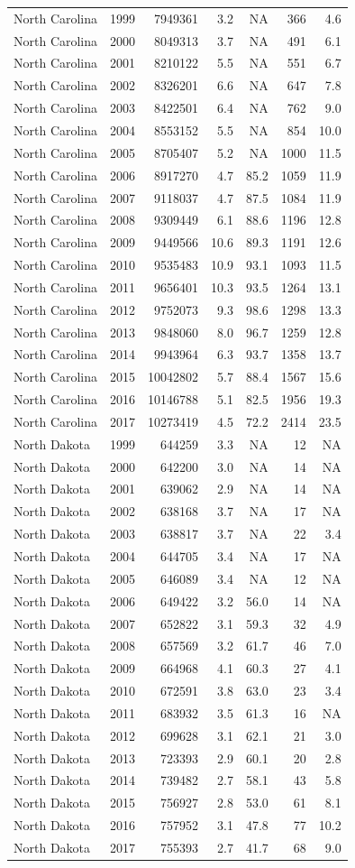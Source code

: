 \documentclass[
]{article}
\begin{document}
\begin{longtable}[]{@{}lrrrrrr@{}}
North Carolina & 1999 & 7949361 & 3.2 & NA & 366 & 4.6\tabularnewline
North Carolina & 2000 & 8049313 & 3.7 & NA & 491 & 6.1\tabularnewline
North Carolina & 2001 & 8210122 & 5.5 & NA & 551 & 6.7\tabularnewline
North Carolina & 2002 & 8326201 & 6.6 & NA & 647 & 7.8\tabularnewline
North Carolina & 2003 & 8422501 & 6.4 & NA & 762 & 9.0\tabularnewline
North Carolina & 2004 & 8553152 & 5.5 & NA & 854 & 10.0\tabularnewline
North Carolina & 2005 & 8705407 & 5.2 & NA & 1000 & 11.5\tabularnewline
North Carolina & 2006 & 8917270 & 4.7 & 85.2 & 1059 &
11.9\tabularnewline
North Carolina & 2007 & 9118037 & 4.7 & 87.5 & 1084 &
11.9\tabularnewline
North Carolina & 2008 & 9309449 & 6.1 & 88.6 & 1196 &
12.8\tabularnewline
North Carolina & 2009 & 9449566 & 10.6 & 89.3 & 1191 &
12.6\tabularnewline
North Carolina & 2010 & 9535483 & 10.9 & 93.1 & 1093 &
11.5\tabularnewline
North Carolina & 2011 & 9656401 & 10.3 & 93.5 & 1264 &
13.1\tabularnewline
North Carolina & 2012 & 9752073 & 9.3 & 98.6 & 1298 &
13.3\tabularnewline
North Carolina & 2013 & 9848060 & 8.0 & 96.7 & 1259 &
12.8\tabularnewline
North Carolina & 2014 & 9943964 & 6.3 & 93.7 & 1358 &
13.7\tabularnewline
North Carolina & 2015 & 10042802 & 5.7 & 88.4 & 1567 &
15.6\tabularnewline
North Carolina & 2016 & 10146788 & 5.1 & 82.5 & 1956 &
19.3\tabularnewline
North Carolina & 2017 & 10273419 & 4.5 & 72.2 & 2414 &
23.5\tabularnewline
North Dakota & 1999 & 644259 & 3.3 & NA & 12 & NA\tabularnewline
North Dakota & 2000 & 642200 & 3.0 & NA & 14 & NA\tabularnewline
North Dakota & 2001 & 639062 & 2.9 & NA & 14 & NA\tabularnewline
North Dakota & 2002 & 638168 & 3.7 & NA & 17 & NA\tabularnewline
North Dakota & 2003 & 638817 & 3.7 & NA & 22 & 3.4\tabularnewline
North Dakota & 2004 & 644705 & 3.4 & NA & 17 & NA\tabularnewline
North Dakota & 2005 & 646089 & 3.4 & NA & 12 & NA\tabularnewline
North Dakota & 2006 & 649422 & 3.2 & 56.0 & 14 & NA\tabularnewline
North Dakota & 2007 & 652822 & 3.1 & 59.3 & 32 & 4.9\tabularnewline
North Dakota & 2008 & 657569 & 3.2 & 61.7 & 46 & 7.0\tabularnewline
North Dakota & 2009 & 664968 & 4.1 & 60.3 & 27 & 4.1\tabularnewline
North Dakota & 2010 & 672591 & 3.8 & 63.0 & 23 & 3.4\tabularnewline
North Dakota & 2011 & 683932 & 3.5 & 61.3 & 16 & NA\tabularnewline
North Dakota & 2012 & 699628 & 3.1 & 62.1 & 21 & 3.0\tabularnewline
North Dakota & 2013 & 723393 & 2.9 & 60.1 & 20 & 2.8\tabularnewline
North Dakota & 2014 & 739482 & 2.7 & 58.1 & 43 & 5.8\tabularnewline
North Dakota & 2015 & 756927 & 2.8 & 53.0 & 61 & 8.1\tabularnewline
North Dakota & 2016 & 757952 & 3.1 & 47.8 & 77 & 10.2\tabularnewline
North Dakota & 2017 & 755393 & 2.7 & 41.7 & 68 & 9.0\tabularnewline

\end{longtable}
\end{document}
